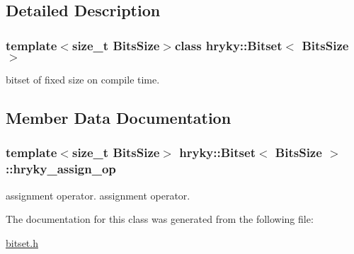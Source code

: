 \subsection{Detailed Description}
\subsubsection*{template$<$size\-\_\-t Bits\-Size$>$class hryky\-::\-Bitset$<$ Bits\-Size $>$}

bitset of fixed size on compile time. 

\subsection{Member Data Documentation}
\hypertarget{classhryky_1_1_bitset_add97c3079f3c0f0ee7b39c40a4c8d498}{
\subsubsection[{hryky\-\_\-assign\-\_\-op}]{\setlength{\rightskip}{0pt plus 5cm}template$<$size\-\_\-t Bits\-Size$>$ {\bf hryky\-::\-Bitset}$<$ Bits\-Size $>$\-::{\bf hryky\-\_\-assign\-\_\-op}}}\label{classhryky_1_1_bitset_add97c3079f3c0f0ee7b39c40a4c8d498}
assignment operator. assignment operator. 

The documentation for this class was generated from the following file\-:\begin{DoxyCompactItemize}
\item 
\hyperlink{bitset_8h}{bitset.\-h}\end{DoxyCompactItemize}
